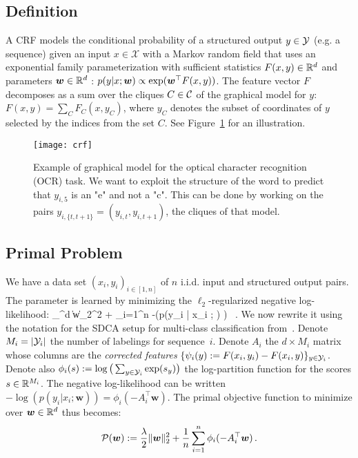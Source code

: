 \subsection{Definition}
A CRF models the conditional probability of a structured output $y \in {\mathcal Y}$ (e.g. a sequence) given an input $x\in \mathcal X$ with a Markov random field that uses an exponential family parameterization with sufficient statistics $F(x,y) \in \mathbb{R}^d$ and parameters $\boldsymbol{w} \in \mathbb{R}^d$ : $p(y | x ; \boldsymbol{w}) \propto \exp(\boldsymbol{w}^{\top}F(x, y))$. The feature vector $F$ decomposes as a sum over the cliques $C \in {\mathcal C}$ of the graphical model for $y$: $F(x, y) = \sum_C F_C(x, y_C)$, where $y_C$ denotes the subset of coordinates of $y$ selected by the indices from the set $C$. See Figure~\ref{crf example} for an illustration.


\begin{figure}
	\centering
	\texttt{[image: crf]}
	\caption[Example of graphical model for the optical character recognition (OCR) task]{
		Example of graphical model for the optical character recognition (OCR) task.
		We want to exploit the structure of the word to predict that $y_{i,5}$ is an "e" and not a "c".
		This can be done by working on the pairs $y_{i,\{t, t+1\} } = (y_{i, t}, y_{i, t+1})$, the cliques of that model.
	}
	\label{crf example}
\end{figure}

\subsection{Primal Problem}
We have a data set $(x_i, y_i)_{i \in [1,n]}$ of $n$ i.i.d. input and structured output pairs.
The parameter is learned by minimizing the $\ell_2$-regularized negative log-likelihood:
\beq\label{negative log-likelihood}
\min_{\bw \in \real^d} \: \| \bm w\|_2^2 +  \sum_{i=1}^{n} -\log\left(p(y_i | x_i ; \bw) \right) \, .
\eeq
We now rewrite it using the notation for the SDCA setup for multi-class classification from~\citet{shalev2016accelerated}.
Denote $M_i = |{\mathcal Y}_i|$ the number of labelings for sequence~$i$.
Denote $A_i$ the $d \times M_i$ matrix whose columns are the \textit{corrected features} $\{\psi_i(y) := F(x_i, y_i) - F(x_i, y)\}_{y \in {\mathcal Y}_i}$.
Denote also $\phi_i(s) := \log \big(\sum_{y \in {\mathcal Y}_i} \exp(s_y)\big)$ the log-partition function for the scores $s \in \mathbb{R}^{M_i}$. The negative log-likelihood can be written $-\log(p(y_i|x_i ;\bm w)) = \phi_i(-A_i^{\top} \bm w)$. The primal objective function to minimize over $\bm w \in \mathbb{R}^d$ thus  becomes:
\begin{equation}
	\label{eq:primal_problem}
	{\mathcal P}(\bm w) := \frac{\lambda}{2}\| \bm w\|_2^2
	+ \frac{1}{n}   \sum_{i=1}^{n} \phi_i(-A_i^{\top} \bm w) \, .
\end{equation}

